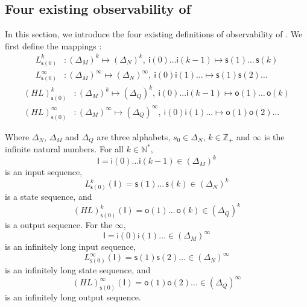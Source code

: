 \subsection{Four existing observability of \BCNs}
In this section, we introduce the four existing definitions of observability of \BCNs. %
We first define the mappings \cite{Zhang2016Observability}:
\begin{equation}
\begin{split}
L^k_{\mathsf{s}(0)} &: (\Delta_M)^k\mapsto(\Delta_N)^k,\ \mathsf{i}(0)\ldots \mathsf{i}({k-1}) \mapsto \mathsf{s}(1) \ldots\, \mathsf{s}(k)\\
L^{\infty}_{\mathsf{s}(0)} &: (\Delta_M)^{\infty}\mapsto(\Delta_N)^{\infty},\ \mathsf{i}(0) \mathsf{i}(1) \ldots  \mapsto \mathsf{s}(1) \mathsf{s}(2) \ldots
\end{split}
\label{equ:5}
\end{equation}
\begin{equation}
\begin{split}
(HL)^k_{\mathsf{s}(0)} &: (\Delta_M)^k\mapsto(\Delta_Q)^k,\ \mathsf{i}(0)\ldots \mathsf{i}(k-1) \mapsto \mathsf{o}(1)\ldots\, \mathsf{o}(k)\\
(HL)^{\infty}_{\mathsf{s}(0)} &: (\Delta_M)^{\infty}\mapsto(\Delta_Q)^{\infty},\ \mathsf{i}(0) \mathsf{i}(1) \ldots  \mapsto \mathsf{o}(1) \mathsf{o}(2)\ldots
\end{split}
\label{equ:6}
\end{equation}

Where $\Delta_N$, $\Delta_M$ and $\Delta_Q$ are three alphabets, $s_0\in \Delta_N$, $k\in \mathbb{Z}_+$ and $\infty$ is the infinite natural numbers. For all  $k\in \mathbb{N}^*$, 
\[\mathsf{I}=\mathsf{i}(0)\ldots \mathsf{i}({k-1}) \in(\Delta_M)^k\] 
is an input sequence, 
\[L^k_{\mathsf{s}(0)}(\mathsf{I})=\mathsf{s}(1) \ldots\, \mathsf{s}(k) \in(\Delta_N)^k\]
 is a state sequence, and 
 \[(HL)^k_{\mathsf{s}(0)}(\mathsf{I})=\mathsf{o}(1)\ldots\, \mathsf{o}(k) \in(\Delta_Q)^k\] 
 is a output sequence. For the $\infty$, 
 \[\mathsf{I}=\mathsf{i}(0) \mathsf{i}(1)\ldots  \in(\Delta_M)^{\infty}\] 
 is an infinitely long input sequence, 
 \[L^{\infty}_{\mathsf{s}(0)}(\mathsf{I})=\mathsf{s}(1) \mathsf{s}(2)\ldots  \in(\Delta_N)^{\infty}\] 
 is an infinitely long state sequence, and 
 \[(HL)^{\infty}_{\mathsf{s}(0)}(\mathsf{I})=\mathsf{o}(1) \mathsf{o}(2)\ldots \in(\Delta_Q)^{\infty}\]
  is an infinitely long output sequence. 
  
